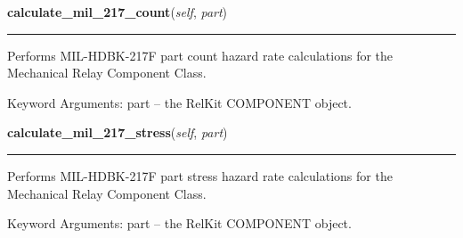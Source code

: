     \label{reliafree:relays:relay:Mechanical:calculate_mil_217_count}

    \vspace{0.5ex}

\hspace{.8\funcindent}\begin{boxedminipage}{\funcwidth}

    \raggedright \textbf{calculate\_mil\_217\_count}(\textit{self}, \textit{part})

    \vspace{-1.5ex}

    \rule{\textwidth}{0.5\fboxrule}
\setlength{\parskip}{2ex}
    Performs MIL-HDBK-217F part count hazard rate calculations for the 
    Mechanical Relay Component Class.

    Keyword Arguments: part -- the RelKit COMPONENT object.

\setlength{\parskip}{1ex}
    \end{boxedminipage}

    \label{reliafree:relays:relay:Mechanical:calculate_mil_217_stress}

    \vspace{0.5ex}

\hspace{.8\funcindent}\begin{boxedminipage}{\funcwidth}

    \raggedright \textbf{calculate\_mil\_217\_stress}(\textit{self}, \textit{part})

    \vspace{-1.5ex}

    \rule{\textwidth}{0.5\fboxrule}
\setlength{\parskip}{2ex}
    Performs MIL-HDBK-217F part stress hazard rate calculations for the 
    Mechanical Relay Component Class.

    Keyword Arguments: part -- the RelKit COMPONENT object.

\setlength{\parskip}{1ex}
    \end{boxedminipage}

